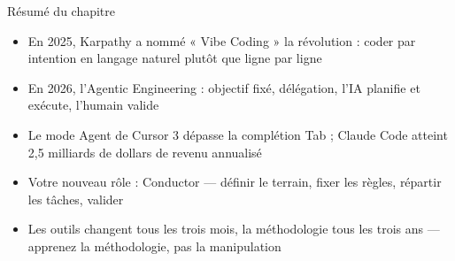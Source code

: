 \begin{tcbsummary}{Résumé du chapitre}
\begin{itemize}
  \item En 2025, Karpathy a nommé « Vibe Coding » la révolution : coder par intention en langage naturel plutôt que ligne par ligne
  \item En 2026, l'Agentic Engineering : objectif fixé, délégation, l'IA planifie et exécute, l'humain valide
  \item Le mode Agent de Cursor 3 dépasse la complétion Tab ; Claude Code atteint 2,5 milliards de dollars de revenu annualisé
  \item Votre nouveau rôle : Conductor — définir le terrain, fixer les règles, répartir les tâches, valider
  \item Les outils changent tous les trois mois, la méthodologie tous les trois ans — apprenez la méthodologie, pas la manipulation
\end{itemize}

\end{tcbsummary}
